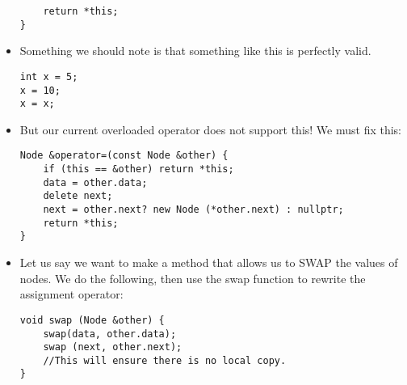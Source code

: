 \documentclass{article}
\begin{document}
\begin{itemize}
\begin{lstlisting}
    return *this;
}
\end{lstlisting}
\item Something we should note is that something like this is perfectly valid.
\begin{lstlisting}
int x = 5;
x = 10;
x = x;
\end{lstlisting}
\item But our current overloaded operator does not support this!  We must fix this:
\begin{lstlisting}
Node &operator=(const Node &other) {
    if (this == &other) return *this;
    data = other.data;
    delete next;
    next = other.next? new Node (*other.next) : nullptr;
    return *this;
}
\end{lstlisting}
\item Let us say we want to make a method that allows us to SWAP the values of nodes.  We do the following, then use the swap function to rewrite the assignment operator:
\begin{lstlisting}
void swap (Node &other) {
    swap(data, other.data);
    swap (next, other.next);
    //This will ensure there is no local copy.
}


\end{lstlisting}
\end{itemize}
\end{document}
